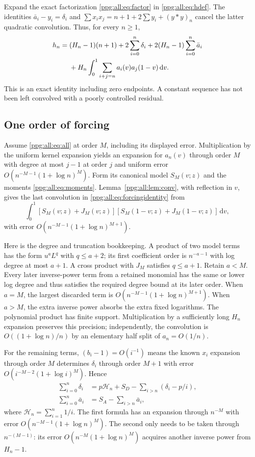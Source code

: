 \documentclass[11pt,letterpaper]{article}
\theoremstyle{remark}\newtheorem{remark}[theorem]{Remark}
\numberwithin{equation}{section}
\newcommand{\HH}{\mathcal H}
\newcommand{\dd}{\mathrm d}
\begin{document}
Expand the exact factorization \eqref{ppg:all:eq:factor} in \eqref{ppg:all:eq:hdef}. The identities
$\bar a_i-y_i=\delta_i$ and
$\sum x_ix_j=n+1+2\sum y_i+(y*y)_n$ cancel the latter quadratic convolution. Thus, for every $n\ge1$,
\begin{align}
 h_n={}&(H_n-1)(n+1)+2\sum_{i=0}^n\delta_i
       +2(H_n-1)\sum_{i=0}^n\bar a_i\notag\\
      &+H_n\int_0^1\sum_{i+j=n}a_i(v)a_j(1-v)\,\dd v.
 \label{ppg:all:eq:forcingidentity}
\end{align}
This is an exact identity including zero endpoints. A constant sequence has not been left convolved with a poorly controlled residual.

\subsection{One order of forcing}
Assume \eqref{ppg:all:eq:all} at order $M$, including its displayed error. Multiplication by the uniform kernel expansion yields an expansion for $a_n(v)$ through order $M$ with degree at most $j-1$ at order $j$ and uniform error $O(n^{-M-1}(1+\log n)^M)$. Form its canonical model $S_M(v;z)$ and the moments \eqref{ppg:all:eq:moments}. Lemma~\ref{ppg:all:lem:conv}, with reflection in $v$, gives the last convolution in \eqref{ppg:all:eq:forcingidentity} from
\begin{equation}\label{ppg:all:eq:integratedproduct}
 \int_0^1[S_M(v;z)+J_M(v;z)]
          [S_M(1-v;z)+J_M(1-v;z)]\,\dd v,
\end{equation}
with error $O(n^{-M-1}(1+\log n)^{M+1})$.

Here is the degree and truncation bookkeeping. A product of two model terms has the form $u^aL^q$ with $q\le a+2$; its first coefficient order is $n^{-a-1}$ with log degree at most $a+1$. A cross product with $J_M$ satisfies $q\le a+1$. Retain $a<M$. Every later inverse-power term from a retained monomial has the same or lower log degree and thus satisfies the required degree bound at its later order. When $a=M$, the largest discarded term is $O(n^{-M-1}(1+\log n)^{M+1})$. When $a>M$, the extra inverse power absorbs the extra fixed logarithms. The polynomial product has finite support. Multiplication by a sufficiently long $H_n$ expansion preserves this precision; independently, the convolution is $O((1+\log n)/n)$ by an elementary half split of $a_n=O(1/n)$.

For the remaining terms, $(b_i-1)=O(i^{-1})$ means the known $x_i$ expansion through order $M$ determines $\delta_i$ through order $M+1$ with error $O(i^{-M-2}(1+\log i)^M)$. Hence
\begin{align}
 \sum_{i=0}^n\delta_i
  &=p\HH_n+S_D-\sum_{i>n}(\delta_i-p/i),\label{ppg:all:eq:deltasum}\\
 \sum_{i=0}^n\bar a_i&=S_A-\sum_{i>n}\bar a_i,\label{ppg:all:eq:abarSum}
\end{align}
where $\HH_n=\sum_{i=1}^n1/i$. The first formula has an expansion through $n^{-M}$ with error $O(n^{-M-1}(1+\log n)^M)$. The second only needs to be taken through $n^{-(M-1)}$: its error $O(n^{-M}(1+\log n)^M)$ acquires another inverse power from $H_n-1$.
\end{document}
